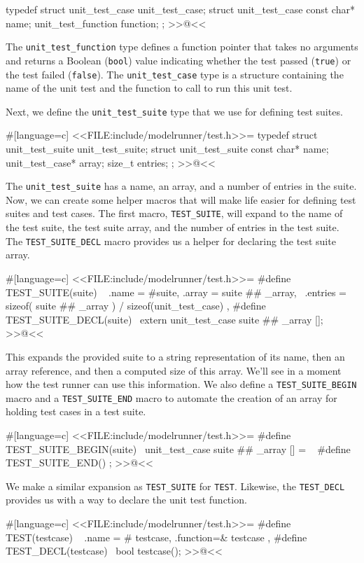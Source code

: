 typedef struct unit_test_case unit_test_case;
struct unit_test_case
{
    const char* name;
    unit_test_function function;
};
>>@<<

The \verb/unit_test_function/ type defines a function pointer that takes no
arguments and returns a Boolean (\verb/bool/) value indicating whether the test
passed (\verb/true/) or the test failed (\verb/false/). The
\verb/unit_test_case/ type is a structure containing the name of the unit test
and the function to call to run this unit test.

Next, we define the \verb/unit_test_suite/ type that we use for defining test
suites.

#[language=c]
<<FILE:include/modelrunner/test.h>>=
typedef struct unit_test_suite unit_test_suite;
struct unit_test_suite
{
    const char* name;
    unit_test_case* array;
    size_t entries;
};
>>@<<

The \verb/unit_test_suite/ has a name, an array, and a number of entries in the
suite. Now, we can create some helper macros that will make life easier for
defining test suites and test cases. The first macro, \verb/TEST_SUITE/, will
expand to the name of the test suite, the test suite array, and the number of
entries in the test suite. The \verb/TEST_SUITE_DECL/ macro provides us a helper
for declaring the test suite array.

#[language=c]
<<FILE:include/modelrunner/test.h>>=
#define TEST_SUITE(suite) \
    { .name = #suite, .array = suite ## _array, \
      .entries = sizeof( suite ## _array ) / sizeof(unit_test_case) },
#define TEST_SUITE_DECL(suite) \
    extern unit_test_case suite ## _array [];
>>@<<

This expands the provided suite to a string representation of its name, then an
array reference, and then a computed size of this array.  We'll see in a moment
how the test runner can use this information. We also define a
\verb/TEST_SUITE_BEGIN/ macro and a \verb/TEST_SUITE_END/ macro to automate the
creation of an array for holding test cases in a test suite.

#[language=c]
<<FILE:include/modelrunner/test.h>>=
#define TEST_SUITE_BEGIN(suite) \
    unit_test_case suite ## _array [] = \
    {
#define TEST_SUITE_END() };
>>@<<

We make a similar expansion as \verb/TEST_SUITE/ for \verb/TEST/. Likewise, the
\verb/TEST_DECL/ provides us with a way to declare the unit test function.

#[language=c]
<<FILE:include/modelrunner/test.h>>=
#define TEST(testcase) \
    { .name = # testcase, .function=& testcase },
#define TEST_DECL(testcase) \
    bool testcase();
>>@<<

